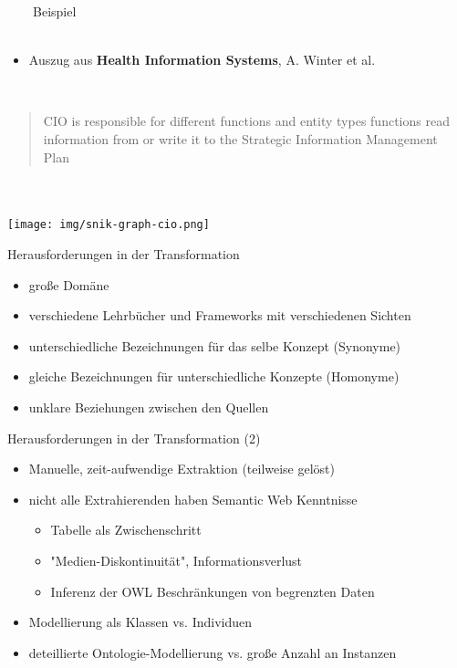 \documentclass[aspectratio=1610,12pt]{beamer}
\begin{document}


\begin{frame}[plain]{~~~~Beispiel}
~\\~\\
\begin{itemize}
	\item Auszug aus \textbf{Health Information Systems}, A. Winter et al. \\
\end{itemize}
~\\
\begin{quote}CIO is responsible for different functions and entity types %
 functions read information from or write it to the Strategic Information Management Plan %
\end{quote}
~\\~\\
\centering\texttt{[image: img/snik-graph-cio.png]}
\end{frame}
\restoregeometry

\begin{frame}{Herausforderungen in der Transformation}

\begin{itemize}
\item große Domäne
\item verschiedene Lehrbücher und Frameworks mit verschiedenen Sichten
\item unterschiedliche Bezeichnungen für das selbe Konzept (Synonyme)
\item gleiche Bezeichnungen für unterschiedliche Konzepte (Homonyme)
\item unklare Beziehungen zwischen den Quellen
\end{itemize}
\end{frame}

\begin{frame}{Herausforderungen in der Transformation (2)}
\begin{itemize}
	\item Manuelle, zeit-aufwendige Extraktion (teilweise gelöst)
\item nicht alle Extrahierenden haben Semantic Web Kenntnisse
\begin{itemize}
\item Tabelle als Zwischenschritt
\item "Medien-Diskontinuität", Informationsverlust
\item Inferenz der OWL Beschränkungen von begrenzten Daten 
\end{itemize}
\item Modellierung als Klassen vs. Individuen
\item deteillierte Ontologie-Modellierung vs. große Anzahl an Instanzen 
\end{itemize}
\end{frame}
\end{document}
